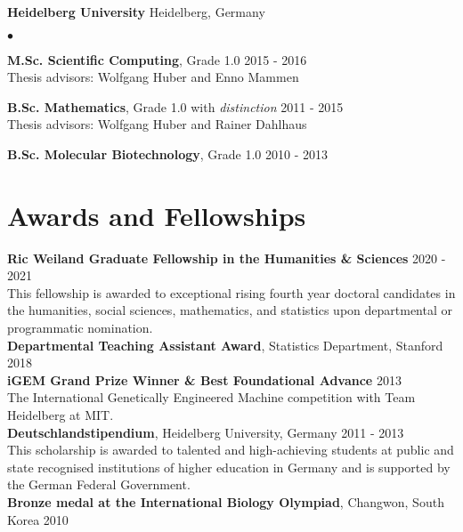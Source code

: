 \documentclass[margin,line]{res}
\newenvironment{list2}{
  \begin{list}{$\bullet$}{%
      \setlength{\itemsep}{0in}
      \setlength{\parsep}{0in} \setlength{\parskip}{0in}
      \setlength{\topsep}{0in} \setlength{\partopsep}{0in}
      \setlength{\leftmargin}{0.2in}}}{\end{list}}
\begin{document}
\begin{resume}
\vspace*{-2.5mm}
{\bf {Heidelberg University}} \hfill  {Heidelberg, Germany}\\
\vspace*{-.14in}
\begin{list2}
\item \textbf{M.Sc. Scientific Computing}, Grade 1.0 \hfill 2015 - 2016\\
Thesis advisors: Wolfgang Huber and Enno Mammen 
\item \textbf{B.Sc. Mathematics}, Grade 1.0 with \emph{distinction} \hfill 2011 - 2015\\
Thesis advisors: Wolfgang Huber and Rainer Dahlhaus 
\item \textbf{B.Sc. Molecular Biotechnology}, Grade 1.0 \hfill 2010 - 2013
\end{list2}


\section{\sc Awards and Fellowships }
\textbf{Ric Weiland Graduate Fellowship  in the Humanities \& Sciences } \hfill 2020 - 2021\\
This fellowship is awarded to exceptional rising fourth year doctoral candidates in the humanities, social sciences, mathematics, and
statistics upon departmental or programmatic nomination.\\
\textbf{Departmental Teaching Assistant Award}, Statistics Department, Stanford  \hfill  2018\\
\textbf{iGEM Grand Prize Winner \& Best Foundational Advance} \hfill  2013 \\
The International Genetically Engineered Machine competition with Team Heidelberg at MIT.\\
\textbf{Deutschlandstipendium}, Heidelberg University, Germany \hfill 2011 - 2013\\
This scholarship is awarded to talented and high-achieving students at public and state recognised institutions of higher education in Germany and is supported by the German Federal Government.\\
\textbf{Bronze medal at the International Biology Olympiad}, Changwon, South Korea \hfill 2010



\end{resume}
\end{document}
